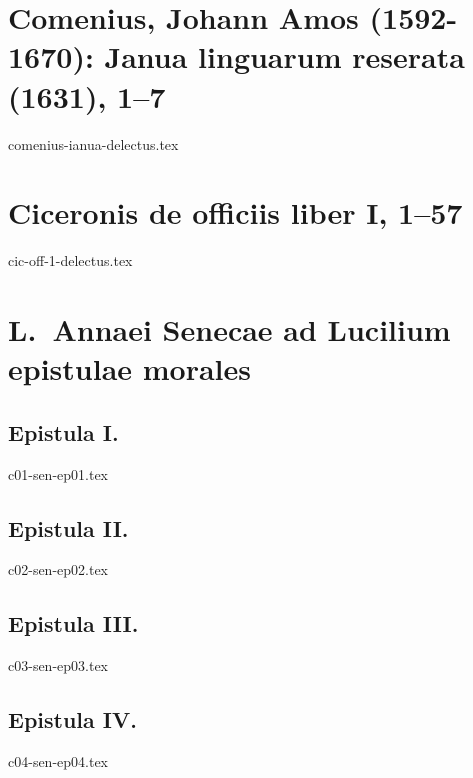 \documentclass[a4paper,12pt,twoside]{book}
\begin{document}
{
\setlength{\parindent}{0pt}


\part[Comenius, Ianua 1–7]{Comenius, Johann Amos (1592-1670): Janua linguarum reserata (1631),  1–7}

{comenius-ianua-delectus.tex}

\part{Ciceronis de officiis liber I, 1–57}

{cic-off-1-delectus.tex}


\part{L.\ Annaei Senecae ad Lucilium epistulae morales}

\chapter{Epistula I.}

{c01-sen-ep01.tex}

\chapter{Epistula II.}

{c02-sen-ep02.tex}

\chapter{Epistula III.}

{c03-sen-ep03.tex}

\chapter{Epistula IV.}

{c04-sen-ep04.tex}






}
\end{document}
